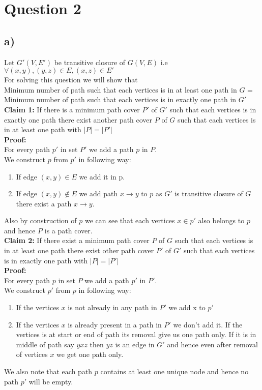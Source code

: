 \documentclass{report}
\begin{document}
 \section*{Question 2}
 \subsection*{a)}
 Let $G'(V,E')$ be transitive closure of $G(V,E)$ i.e $\forall(x,y),(y,z)\in E, (x,z) \in E'$\\
 For solving this question we will show that\\
 Minimum number of path such that each vertices is in at least one path in $G$ = Minimum number of path such that each vertices is in exactly one path in $G'$\\
 
 \textbf{Claim 1:}
 If there is a minimum path cover $P'$ of $G'$ such that each vertices is in exactly one path there exist another path cover $P$ of $G$ such that each vertices is in at least one path with $|P| = |P'|$\\
 
 \textbf{Proof:}\\
 For every path $p'$ in set $P'$ we add a path $p$ in $P$.\\
 We construct $p$ from $p'$ in following way:
 \begin{enumerate}
     \item  If edge $(x,y) \in E$ we add it in p.
     \item   If edge $(x,y) \not\in E$ we add path $x \rightarrow y$ to $p$ as $G'$ is transitive closure of $G$ there exist a path $x \rightarrow y$.
 \end{enumerate}

 Also by construction of $p$ we can see that each vertices $x \in p'$ also belongs to $p$ and hence $P$ is a path cover.\\
 
 \textbf{Claim 2:}
 If there exist a minimum path cover $P$ of $G$ such that each vertices is in at least one path there exist other path cover $P'$ of $G'$ such that each vertices is in exactly one path with $|P| = |P'|$\\
 
\textbf{Proof:}\\
For every path $p$ in set $P$ we add a path $p'$ in $P'$.\\
 We construct $p'$ from $p$ in following way:
 \begin{enumerate}
     \item If the vertices $x$ is not already in any path in $P'$ we add x to $p'$
     \item If the vertices $x$ is already present in a path in $P'$ we don't add it. If the vertices is at start or end of path its removal give us one path only. If it is in middle of path say $yxz$ then $yz$ is an edge in $G'$ and hence even after removal of vertices $x$ we get one path only.
 \end{enumerate}
 We also note that each path $p$ contains at least one unique node and hence no path $p'$ will be empty.\\
 
\end{document}

